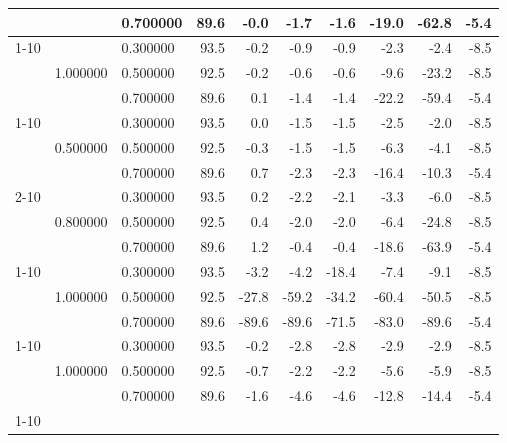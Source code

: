 \begin{tabular}{lllrrrrrrr}
 &  & 0.700000 & 89.6 & -0.0 & -1.7 & -1.6 & -19.0 & -62.8 & -5.4 \\
\cline{1-10} \cline{2-10}
\multirow[t]{3}{*}{llm:semantic\_negation} & \multirow[t]{3}{*}{1.000000} & 0.300000 & 93.5 & -0.2 & -0.9 & -0.9 & -2.3 & -2.4 & -8.5 \\
 &  & 0.500000 & 92.5 & -0.2 & -0.6 & -0.6 & -9.6 & -23.2 & -8.5 \\
 &  & 0.700000 & 89.6 & 0.1 & -1.4 & -1.4 & -22.2 & -59.4 & -5.4 \\
\cline{1-10} \cline{2-10}
\multirow[t]{6}{*}{partial} & \multirow[t]{3}{*}{0.500000} & 0.300000 & 93.5 & 0.0 & -1.5 & -1.5 & -2.5 & -2.0 & -8.5 \\
 &  & 0.500000 & 92.5 & -0.3 & -1.5 & -1.5 & -6.3 & -4.1 & -8.5 \\
 &  & 0.700000 & 89.6 & 0.7 & -2.3 & -2.3 & -16.4 & -10.3 & -5.4 \\
\cline{2-10}
 & \multirow[t]{3}{*}{0.800000} & 0.300000 & 93.5 & 0.2 & -2.2 & -2.1 & -3.3 & -6.0 & -8.5 \\
 &  & 0.500000 & 92.5 & 0.4 & -2.0 & -2.0 & -6.4 & -24.8 & -8.5 \\
 &  & 0.700000 & 89.6 & 1.2 & -0.4 & -0.4 & -18.6 & -63.9 & -5.4 \\
\cline{1-10} \cline{2-10}
\multirow[t]{3}{*}{sleeper} & \multirow[t]{3}{*}{1.000000} & 0.300000 & 93.5 & -3.2 & -4.2 & -18.4 & -7.4 & -9.1 & -8.5 \\
 &  & 0.500000 & 92.5 & -27.8 & -59.2 & -34.2 & -60.4 & -50.5 & -8.5 \\
 &  & 0.700000 & 89.6 & -89.6 & -89.6 & -71.5 & -83.0 & -89.6 & -5.4 \\
\cline{1-10} \cline{2-10}
\multirow[t]{3}{*}{uninformative} & \multirow[t]{3}{*}{1.000000} & 0.300000 & 93.5 & -0.2 & -2.8 & -2.8 & -2.9 & -2.9 & -8.5 \\
 &  & 0.500000 & 92.5 & -0.7 & -2.2 & -2.2 & -5.6 & -5.9 & -8.5 \\
 &  & 0.700000 & 89.6 & -1.6 & -4.6 & -4.6 & -12.8 & -14.4 & -5.4 \\
\cline{1-10} \cline{2-10}
\bottomrule
\end{tabular}

